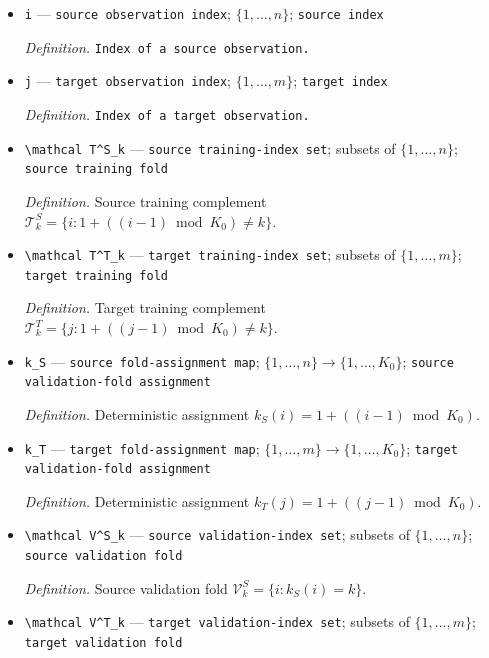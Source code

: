 \documentclass{article}
\begin{document}
\begin{itemize}
  \item \texttt{i} --- \texttt{source observation index}; \(\{1,\ldots,n\}\); \texttt{source index}
  \par\smallskip\noindent\emph{Definition.} \texttt{Index of a source observation.}
  \item \texttt{j} --- \texttt{target observation index}; \(\{1,\ldots,m\}\); \texttt{target index}
  \par\smallskip\noindent\emph{Definition.} \texttt{Index of a target observation.}
  \item \texttt{\textbackslash{}\allowbreak{}mathcal T\textasciicircum{}S\_\allowbreak{}k} --- \texttt{source training-\allowbreak{}index set}; subsets of \(\{1,\ldots,n\}\); \texttt{source training fold}
  \par\smallskip\noindent\emph{Definition.} Source training complement \(\mathcal T^S_k=\{i:1+((i-1)\bmod K_0)\ne k\}\).
  \item \texttt{\textbackslash{}\allowbreak{}mathcal T\textasciicircum{}T\_\allowbreak{}k} --- \texttt{target training-\allowbreak{}index set}; subsets of \(\{1,\ldots,m\}\); \texttt{target training fold}
  \par\smallskip\noindent\emph{Definition.} Target training complement \(\mathcal T^T_k=\{j:1+((j-1)\bmod K_0)\ne k\}\).
  \item \texttt{k\_\allowbreak{}S} --- \texttt{source fold-\allowbreak{}assignment map}; \(\{1,\ldots,n\}\to\{1,\ldots,K_0\}\); \texttt{source validation-\allowbreak{}fold assignment}
  \par\smallskip\noindent\emph{Definition.} Deterministic assignment \(k_S(i)=1+((i-1)\bmod K_0)\).
  \item \texttt{k\_\allowbreak{}T} --- \texttt{target fold-\allowbreak{}assignment map}; \(\{1,\ldots,m\}\to\{1,\ldots,K_0\}\); \texttt{target validation-\allowbreak{}fold assignment}
  \par\smallskip\noindent\emph{Definition.} Deterministic assignment \(k_T(j)=1+((j-1)\bmod K_0)\).
  \item \texttt{\textbackslash{}\allowbreak{}mathcal V\textasciicircum{}S\_\allowbreak{}k} --- \texttt{source validation-\allowbreak{}index set}; subsets of \(\{1,\ldots,n\}\); \texttt{source validation fold}
  \par\smallskip\noindent\emph{Definition.} Source validation fold \(\mathcal V^S_k=\{i:k_S(i)=k\}\).
  \item \texttt{\textbackslash{}\allowbreak{}mathcal V\textasciicircum{}T\_\allowbreak{}k} --- \texttt{target validation-\allowbreak{}index set}; subsets of \(\{1,\ldots,m\}\); \texttt{target validation fold}

\end{itemize}
\end{document}
